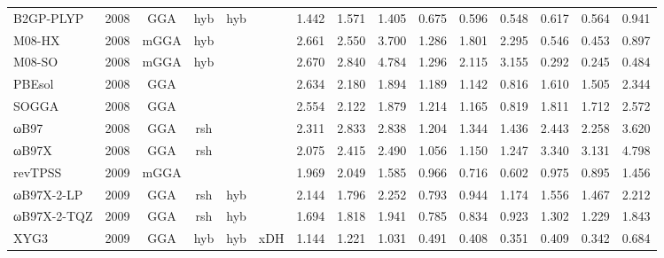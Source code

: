 \begin{landscape}
\begin{longtable}{lcccccrrrrrrrrr}
    B2GP-PLYP        & 2008 & GGA  & hyb      & hyb         &           & 1.442             & 1.571             & 1.405  & 0.675              & 0.596             & 0.548  & 0.617   & 0.564 & 0.941 \\
    M08-HX           & 2008 & mGGA & hyb      &             &           & 2.661             & 2.550             & 3.700  & 1.286              & 1.801             & 2.295  & 0.546   & 0.453 & 0.897 \\
    M08-SO           & 2008 & mGGA & hyb      &             &           & 2.670             & 2.840             & 4.784  & 1.296              & 2.115             & 3.155  & 0.292   & 0.245 & 0.484 \\
    PBEsol           & 2008 & GGA  &          &             &           & 2.634             & 2.180             & 1.894  & 1.189              & 1.142             & 0.816  & 1.610   & 1.505 & 2.344 \\
    SOGGA            & 2008 & GGA  &          &             &           & 2.554             & 2.122             & 1.879  & 1.214              & 1.165             & 0.819  & 1.811   & 1.712 & 2.572 \\
    ωB97             & 2008 & GGA  & rsh      &             &           & 2.311             & 2.833             & 2.838  & 1.204              & 1.344             & 1.436  & 2.443   & 2.258 & 3.620 \\
    ωB97X            & 2008 & GGA  & rsh      &             &           & 2.075             & 2.415             & 2.490  & 1.056              & 1.150             & 1.247  & 3.340   & 3.131 & 4.798 \\
    revTPSS          & 2009 & mGGA &          &             &           & 1.969             & 2.049             & 1.585  & 0.966              & 0.716             & 0.602  & 0.975   & 0.895 & 1.456 \\
    ωB97X-2-LP       & 2009 & GGA  & rsh      & hyb         &           & 2.144             & 1.796             & 2.252  & 0.793              & 0.944             & 1.174  & 1.556   & 1.467 & 2.212 \\
    ωB97X-2-TQZ      & 2009 & GGA  & rsh      & hyb         &           & 1.694             & 1.818             & 1.941  & 0.785              & 0.834             & 0.923  & 1.302   & 1.229 & 1.843 \\
    XYG3             & 2009 & GGA  & hyb      & hyb         & xDH       & 1.144             & 1.221             & 1.031  & 0.491              & 0.408             & 0.351  & 0.409   & 0.342 & 0.684 \\

\end{longtable}
\end{landscape}
